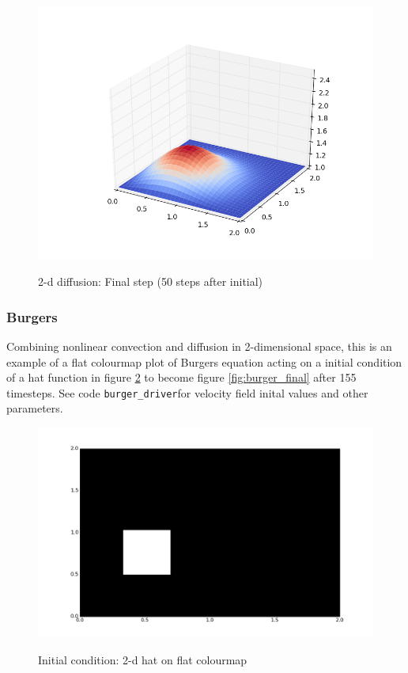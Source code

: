 \documentclass[11pt]{article}
\begin{document}
{	\begin{figure}[H]
	\centering
	\caption{2-d diffusion: Final step (50 steps after initial)}
	\includegraphics[scale=0.6]{diff_final.png}
	\label{fig:diff_final}
	\end{figure}

\subsubsection{Burgers}
Combining nonlinear convection and diffusion in 2-dimensional space, this is an example
of a flat colourmap plot of Burgers equation acting on a initial condition of a hat
function in figure \ref{fig:burger_0} to become figure \ref{fig:burger_final} after
155 timesteps. See code \texttt{burger\_driver}for velocity field inital values and other
parameters.

	\begin{figure}[H]
	\centering
	\caption{Initial condition: 2-d hat on flat colourmap}
	\includegraphics[scale=0.45]{burger_0.png}
	\label{fig:burger_0}
	\end{figure}

}
\end{document}
